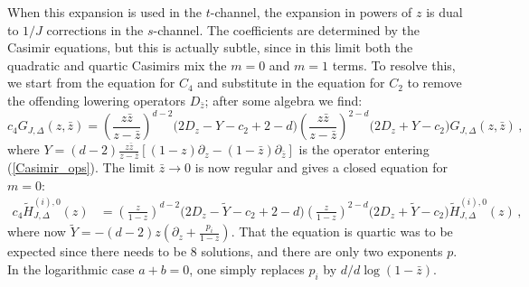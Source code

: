 \documentclass[11pt, reqno,preprint]{article}
\def\be{\begin{equation}}
\def\ee{\end{equation}}
\def\zbar{\bar{z}}
\def\j{J}
\begin{document}
\begin{appendix}
When this expansion is used in the $t$-channel, the expansion in powers of $z$ is dual to $1/\j$ corrections in the $s$-channel.
The coefficients are determined by the Casimir equations, but this is actually subtle,
since in this limit both the quadratic and quartic Casimirs mix the $m=0$ and $m=1$ terms. To resolve this,
we start from the equation for $C_4$ and substitute in the equation for $C_2$ to remove the offending lowering operators
$D_{\zbar}$; after some algebra we find:
\be
 c_4 G_{\j,\Delta}(z,\zbar) =
 \left(\frac{z\zbar}{z-\zbar}\right)^{d-2}\big(2D_z-Y-c_2+2-d\big)
\left(\frac{z\zbar}{z-\zbar}\right)^{2-d}\big(2D_z+Y-c_2\big)G_{\j,\Delta}(z,\zbar)\,,
\ee
where $Y=(d-2)\frac{z\zbar}{z-\zbar}\left[(1-z)\partial_z-(1-\zbar)\partial_{\zbar}\right]$ is the operator entering (\ref{Casimir_ops}).
The limit $\zbar\to 0$ is now regular and gives a closed equation for $m=0$:
\be\begin{aligned}
 c_4 \tilde{H}_{\j,\Delta}^{(i),0}(z)&=
 \left(\frac{z}{1-z}\right)^{d-2} \big(2D_z -\tilde{Y}-c_2 +2-d\big) \left(\frac{z}{1-z}\right)^{2-d}
 \big(2D_z +\tilde{Y}-c_2\big)\tilde{H}_{\j,\Delta}^{(i),0}(z)\,, \label{quartic_cross_channel}
\end{aligned}\ee
where now $\tilde{Y}=-(d-2)z(\partial_z + \frac{p_i}{1-z})$.
That the equation is quartic was to be expected since there needs to be 8 solutions, and there are only two exponents $p$.
In the logarithmic case $a+b=0$, one simply replaces $p_i$ by $d/d\log(1-\zbar)$.


\end{appendix}
\end{document}
